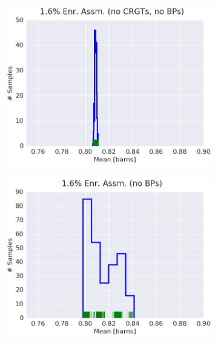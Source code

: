 \begin{figure}[h!]
\centering
\begin{subfigure}{0.5\textwidth}
  \centering
  \includegraphics[width=\linewidth]{figures/patterns/assm-1.6-inf/hist-kde-rug/assm-16-inf-capt-1}
  \caption{}
  \label{fig:chap9-hist-assm-1.6-inf-capt}
\end{subfigure}%
\begin{subfigure}{0.5\textwidth}
  \centering
  \includegraphics[width=\linewidth]{figures/patterns/assm-1.6/hist-kde-rug/assm-16-capt-1}
  \caption{}
  \label{fig:chap9-hist-assm-1.6-capt}
\end{subfigure}
\begin{subfigure}{0.5\textwidth}

\end{subfigure}
\end{figure}
